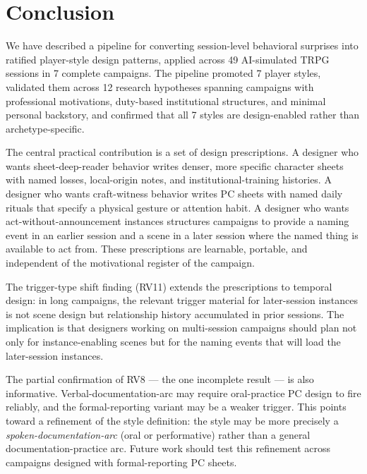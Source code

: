 
\section{Conclusion}
\label{sec:conclusion}

We have described a pipeline for converting session-level behavioral surprises into
ratified player-style design patterns, applied across 49 AI-simulated TRPG sessions
in 7 complete campaigns. The pipeline promoted 7 player styles, validated them across
12 research hypotheses spanning campaigns with professional motivations, duty-based
institutional structures, and minimal personal backstory, and confirmed that all 7
styles are design-enabled rather than archetype-specific.

The central practical contribution is a set of design prescriptions. A designer who
wants sheet-deep-reader behavior writes denser, more specific character sheets with
named losses, local-origin notes, and institutional-training histories. A designer
who wants craft-witness behavior writes PC sheets with named daily rituals that specify
a physical gesture or attention habit. A designer who wants act-without-announcement
instances structures campaigns to provide a naming event in an earlier session and a
scene in a later session where the named thing is available to act from. These
prescriptions are learnable, portable, and independent of the motivational register
of the campaign.

The trigger-type shift finding (RV11) extends the prescriptions to temporal design:
in long campaigns, the relevant trigger material for later-session instances is not
scene design but relationship history accumulated in prior sessions. The implication
is that designers working on multi-session campaigns should plan not only for
instance-enabling scenes but for the naming events that will load the later-session
instances.

The partial confirmation of RV8 --- the one incomplete result --- is also informative.
Verbal-documentation-arc may require oral-practice PC design to fire reliably, and
the formal-reporting variant may be a weaker trigger. This points toward a refinement
of the style definition: the style may be more precisely a \textit{spoken-documentation-arc}
(oral or performative) rather than a general documentation-practice arc. Future work
should test this refinement across campaigns designed with formal-reporting PC sheets.

